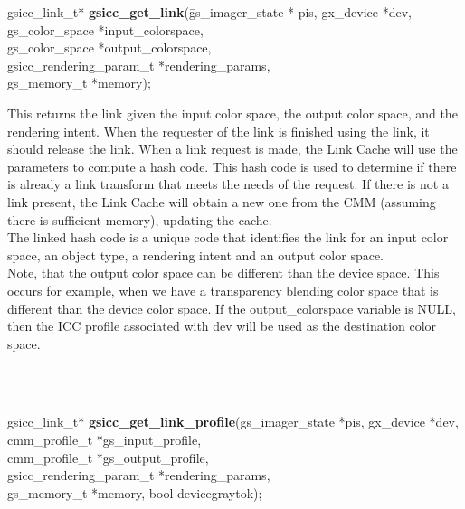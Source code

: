 \documentclass[12pt,notitlepage]{article}
\begin{document}
\begin{tabbing}
\noindent gsicc\_link\_t* {\bf gsicc\_get\_link}(\=gs\_imager\_state * pis, gx\_device *dev,\\
				     \> gs\_color\_space  *input\_colorspace, \\
                                               \>gs\_color\_space *output\_colorspace,\\
                                               \> gsicc\_rendering\_param\_t *rendering\_params,\\
                                               \>gs\_memory\_t *memory);\\
\end{tabbing}

\begin{minipage}[h]{6.0in}
This returns the link given the input color space, the output color space, and the rendering intent.   When the requester of the link is finished using the link, it should release the link.  When a link request is made, the Link Cache will use the parameters to compute a hash code.  This hash code is used to determine if there is already a link transform that meets the needs of the request.  If there is not a link present, the Link Cache will obtain a new one from the CMM (assuming there is sufficient memory), updating the cache.\\

The linked hash code is a unique code that identifies the link for an input color space, an object type, a rendering intent and an output color space.\\

Note, that the output color space can be different than the device space.  This occurs for example, when we have a transparency blending color space that is different than the device color space.  If the output\_colorspace variable is NULL, then the ICC profile associated with dev will be used as the destination color space.
\end{minipage}\\
\\

\begin{tabbing}
\noindent gsicc\_link\_t* {\bf gsicc\_get\_link\_profile}(\=gs\_imager\_state *pis, gx\_device *dev,\\
\> cmm\_profile\_t *gs\_input\_profile, \\
\> cmm\_profile\_t *gs\_output\_profile, \\
\> gsicc\_rendering\_param\_t *rendering\_params,\\
\> gs\_memory\_t *memory, bool devicegraytok);\\
\end{tabbing}
\end{document}
